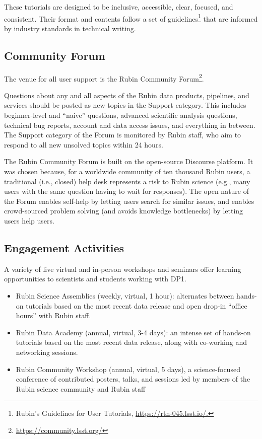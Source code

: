 These tutorials are designed to be inclusive, accessible, clear, focused, and consistent.
Their format and contents follow a set of guidelines\footnote{Rubin's Guidelines for User Tutorials, \url{https://rtn-045.lsst.io/.}} that are informed by industry standards in technical writing.


\subsection{Community Forum
\label{ssec:forum}}

The venue for all user support is the Rubin Community Forum\footnote{\url{https://community.lsst.org/}}.

Questions about any and all aspects of the Rubin data products, pipelines, and services should be posted as new topics in the Support category.
This includes beginner-level and ``naive'' questions, advanced scientific analysis questions, technical bug reports, account and data access issues, and everything in between.
The Support category of the Forum is monitored by Rubin staff, who aim to respond to all new unsolved topics within 24 hours.

The Rubin Community Forum is built on the open-source Discourse platform.
It was chosen because, for a worldwide community of ten thousand Rubin users, a traditional (i.e., closed) help desk represents a risk to Rubin science (e.g., many users with the same question having to wait for responses).
The open nature of the Forum enables self-help by letting users search for similar issues, and enables crowd-sourced problem solving (and avoids knowledge bottlenecks) by letting users help users.


\subsection{Engagement Activities
\label{ssec:engagement}}

A variety of live virtual and in-person workshops and seminars offer learning opportunities to scientists and students working with \gls{DP1}.

\begin{itemize}
\item Rubin Science Assemblies (weekly, virtual, 1 hour): alternates between hands-on tutorials based on the most recent data release and open drop-in ``office hours'' with Rubin staff.
\item Rubin Data Academy (annual, virtual, 3-4 days): an intense set of hands-on tutorials based on the most recent data release, along with co-working and networking sessions.
\item Rubin Community Workshop (annual, virtual, 5 days), a science-focused conference of contributed posters, talks, and sessions led by members of the Rubin science community and Rubin staff
\end{itemize}

